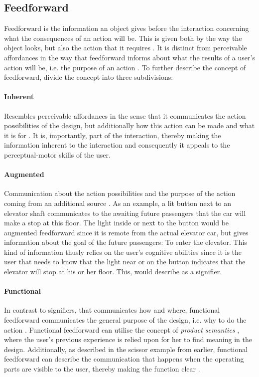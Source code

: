\subsection{Feedforward} Feedforward is the information an object gives before the interaction concerning what the consequences of an action will be. This is given both by the way the object looks, but also the action that it requires \cite{frogger}. It is distinct from perceivable affordances in the way that feedforward informs about what the results of a user's action will be, i.e. the purpose of an action \cite{vermeulen}. To further describe the concept of feedforward,  divide the concept into three subdivisions:
\paragraph{Inherent} Resembles perceivable affordances \cite{norman} in the sense that it communicates the action possibilities of the design, but additionally how this action can be made and what it is for \cite{frogger}. It is, importantly, part of the interaction, thereby making the information inherent to the interaction and consequently it appeals to the perceptual-motor skills of the user.
\paragraph{Augmented} Communication about the action possibilities and the purpose of the action coming from an additional source \cite{frogger}. As an example, a lit button next to an elevator shaft communicates to the awaiting future passengers that the car will make a stop at this floor. The light inside or next to the button would be augmented feedforward since it is remote from the actual elevator car, but gives information about the goal of the future passengers: To enter the elevator. This kind of information thusly relies on the user's cognitive abilities since it is the user that needs to know that the light near or on the button indicates that the elevator will stop at his or her floor. This,  would describe as a signifier.
\paragraph{Functional} In contrast to signifiers, that communicates how and where, functional feedforward communicates the general purpose of the design, i.e. why to do the action \cite{frogger}. Functional feedforward can utilise the concept of \textit{product semantics} \cite{semantics}, where the user's previous experience is relied upon for her to find meaning in the design. Additionally, as described in the scissor example from earlier, functional feedforward can describe the communication that happens when the operating parts are visible to the user, thereby making the function clear \cite{frogger}.

